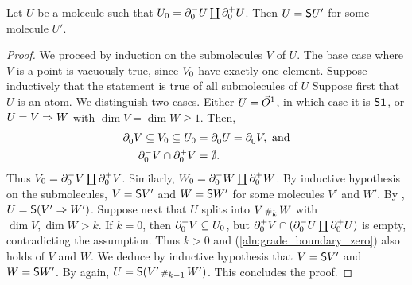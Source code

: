 \begin{lem} \label{lem:has_two_point_is_susp}
    Let \( U \) be a molecule such that \( \gr{0}{U} = \bd{0}{-} U \coprod \bd{0}{+} U \).
    Then \( U = \sus{U'} \) for some molecule \( U' \).
\end{lem}
\begin{proof}
    We proceed by induction on the submolecules \( V \) of \( U \).
    The base case where \( V \) is a point is vacuously true, since \( \gr{0}{V} \) have exactly one element.
    Suppose inductively that the statement is true of all submolecules of \( U \)
    Suppose first that \( U \) is an atom.
    We distinguish two cases.
    Either \( U = \dglobe{1} \), in which case it is \( \sus{\pt} \), or \( U = V \celto W \) with \( \dim V = \dim W \geq 1 \).
    Then, 
    \begin{align} 
         \bd{0}{} V \subseteq \gr{0}{V} \subseteq \gr{0}{U} &= \bd{0}{} U = \bd{0}{} V, \text{ and} \nonumber\\
         \bd{0}{-} V \cap \bd{0}{+} V &= \emptyset \label{aln:grade_boundary_zero}.
    \end{align}
    Thus \( \gr{0}{V} = \bd{0}{-} V \coprod \bd{0}{+} V\).
    Similarly, \( \gr{0}{W} = \bd{0}{-} W \coprod \bd{0}{+} W \).
    By inductive hypothesis on the submolecules, \( V = \sus{V'} \) and \( W = \sus{W'} \) for some molecules \( V' \) and \( W' \).
    By \cite[Proposition 7.3.16]{hadzihasanovic2024combinatorics}, \( U = \sus{(V' \celto W')} \).
    Suppose next that \( U \) splits into \( V \cp{k} W \) with \( \dim V, \dim W > k \).
    If \( k = 0 \), then \( \bd{0}{+} V \subseteq \gr{0}{U} \), but \( \bd{0}{+} V \cap (\bd{0}{-} U \coprod \bd{0}{+} U) \) is empty, contradicting the assumption.
    Thus \( k > 0 \) and (\ref{aln:grade_boundary_zero}) also holds of \( V \) and \( W \).
    We deduce by inductive hypothesis that \( V = \sus{V'} \) and \( W = \sus{W'} \).
    By \cite[Proposition 7.3.16]{hadzihasanovic2024combinatorics} again, \( U = \sus{(V' \cp{k - 1} W')} \).
    This concludes the proof.
\end{proof}

